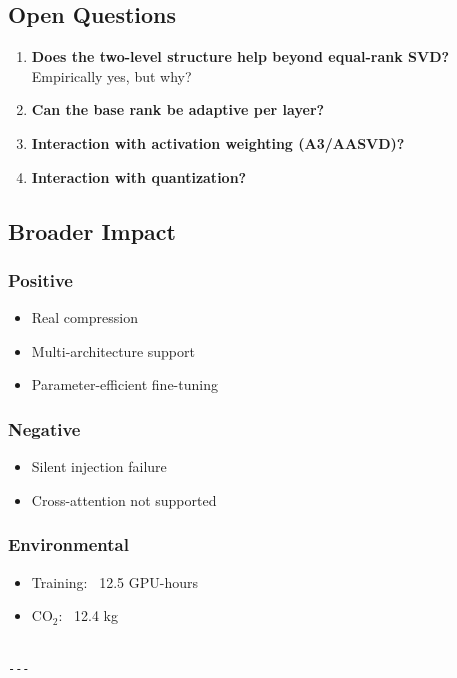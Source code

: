 \subsection{Open Questions}

\begin{enumerate}
\item \textbf{Does the two-level structure help beyond equal-rank SVD?}
  Empirically yes, but why?
\item \textbf{Can the base rank be adaptive per layer?}
\item \textbf{Interaction with activation weighting (A3/AASVD)?}
\item \textbf{Interaction with quantization?}

\end{enumerate}
\subsection{Broader Impact}

\subsubsection{Positive}
\begin{itemize}
\item Real compression
\item Multi-architecture support
\item Parameter-efficient fine-tuning

\end{itemize}
\subsubsection{Negative}
\begin{itemize}
\item Silent injection failure
\item Cross-attention not supported

\end{itemize}
\subsubsection{Environmental}
\begin{itemize}
\item Training: ~12.5 GPU-hours
\item CO$_2$: ~12.4 kg
\end{itemize}
\begin{lstlisting}

---
\end{lstlisting}

